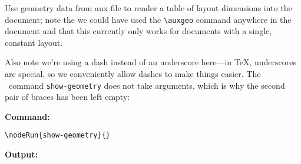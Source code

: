 \auxgeo

Use geometry data from aux file to render a table of layout dimensions into the document;
note the we could have used the \verb#\auxgeo# command anywhere in the document and that
this currently only works for documents with a single, constant layout.

Also note we're using a dash instead of an underscore here---in \TeX, underscores are special, so
we conveniently allow dashes to make things easier. The \CXLTX\ command \verb#show-geometry# does
not take arguments, which is why the second pair of braces has been left empty:

{\textbf{Command:}}
\begin{verbatim}
\nodeRun{show-geometry}{}
\end{verbatim}

{\textbf{Output:}}





